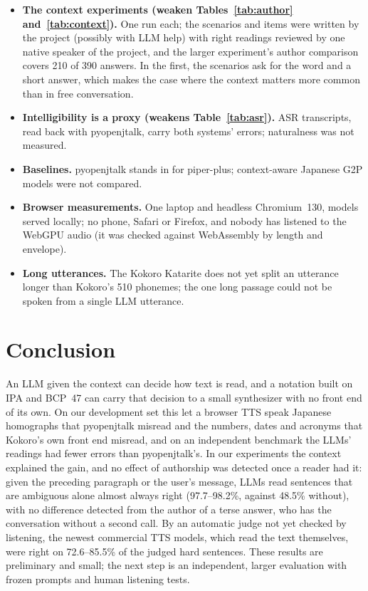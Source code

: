 \documentclass[11pt,a4paper]{article}
\begin{document}
\begin{itemize}
  which an MCP server will also meet, were not tested.
  \item \textbf{The context experiments (weaken Tables~\ref{tab:author} and~\ref{tab:context}).} One run each; the
  scenarios and items were written by the project (possibly with LLM help) with right readings reviewed by one native speaker of the project, and the
  larger experiment's author comparison covers 210 of 390 answers. In the first, the scenarios ask for the word and a short answer, which makes the case where the
  context matters more common than in free conversation.
  \item \textbf{Intelligibility is a proxy (weakens Table~\ref{tab:asr}).} ASR transcripts, read back with pyopenjtalk,
  carry both systems' errors; naturalness was not measured.
  \item \textbf{Baselines.} pyopenjtalk stands in for piper-plus; context-aware Japanese G2P models were not compared.
  \item \textbf{Browser measurements.} One laptop and headless Chromium~130, models served locally; no phone, Safari
  or Firefox, and nobody has listened to the WebGPU audio (it was checked against WebAssembly by length and envelope).
  \item \textbf{Long utterances.} The Kokoro Katarite does not yet split an utterance longer than Kokoro's 510 phonemes;
  the one long passage could not be spoken from a single LLM utterance.
\end{itemize}

\section{Conclusion}

An LLM given the context can decide how text is read, and a notation built on IPA and BCP~47 can carry that decision
to a small synthesizer with no front end of its own. On our development set this let a browser TTS speak Japanese
homographs that pyopenjtalk misread and the numbers, dates and acronyms that Kokoro's own front end misread, and on an
independent benchmark the LLMs' readings had fewer errors than pyopenjtalk's. In our experiments the context
explained the gain, and no effect of authorship was detected once a reader had it: given the preceding paragraph or the user's message, LLMs read sentences that are
ambiguous alone almost always right (97.7--98.2\%, against 48.5\% without), with no difference detected from the author of a terse
answer, who has the conversation without a second call. By an automatic judge not yet checked by listening, the
newest commercial TTS models, which read the text themselves, were right on 72.6--85.5\% of the judged hard sentences.
These results are preliminary and small; the next step is an independent, larger evaluation with frozen prompts and
human listening tests.



\end{document}
